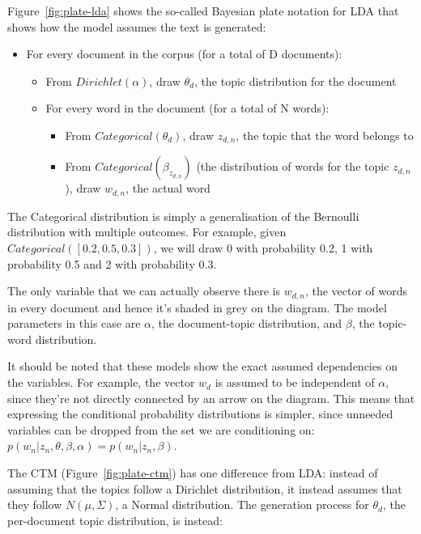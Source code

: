 \documentclass[12pt,a4paper,twoside,openright]{report}
\begin{document}
Figure~\ref{fig:plate-lda} shows the so-called Bayesian plate notation for LDA that shows how the model assumes the text is generated:

\begin{itemize}[noitemsep]
\item For every document in the corpus (for a total of D documents):
\begin{itemize}[noitemsep]
\item From $\mathit{Dirichlet}(\alpha)$, draw $\theta_d$, the topic distribution for the document
\item For every word in the document (for a total of N words):
\begin{itemize}[noitemsep]
\item From $\mathit{Categorical}(\theta_d)$, draw $z_{d, n}$, the topic that the word belongs to
\item From $\mathit{Categorical}(\beta_{z_{d, n}})$ (the distribution of words for the topic $z_{d, n}$), draw $w_{d, n}$, the actual word
\end{itemize}
\end{itemize}
\end{itemize}

The Categorical distribution is simply a generalisation of the Bernoulli distribution with multiple outcomes. For example, given $\mathit{Categorical}([0.2, 0.5, 0.3])$, we will draw 0 with probability 0.2, 1 with probability 0.5 and 2 with probability 0.3.

The only variable that we can actually observe there is $w_{d, n}$, the vector of words in every document and hence it's shaded in grey on the diagram. The model parameters in this case are $\alpha$, the document-topic distribution, and $\beta$, the topic-word distribution.

It should be noted that these models show the exact assumed dependencies on the variables. For example, the vector $w_d$ is assumed to be independent of $\alpha$, since they're not directly connected by an arrow on the diagram. This means that expressing the conditional probability distributions is simpler, since unneeded variables can be dropped from the set we are conditioning on: $p(w_n | z_n, \theta, \beta, \alpha) = p(w_n | z_n, \beta)$.

The CTM (Figure~\ref{fig:plate-ctm}) has one difference from LDA: instead of assuming that the topics follow a Dirichlet distribution, it instead assumes that they follow $N(\mu, \Sigma)$, a Normal distribution. The generation process for $\theta_d$, the per-document topic distribution, is instead:
\end{document}

